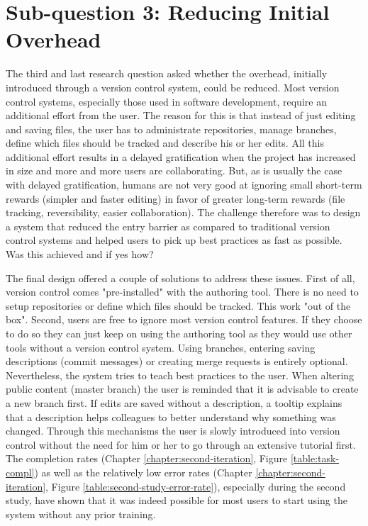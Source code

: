 \section{Sub-question 3: Reducing Initial Overhead}
The third and last research question asked whether the overhead, initially introduced through a version control system, could be reduced. Most version control systems, especially those used in software development, require an additional effort from the user. The reason for this is that instead of just editing and saving files, the user has to administrate repositories, manage branches, define which files should be tracked and describe his or her edits. All this additional effort results in a delayed gratification when the project has increased in size and more and more users are collaborating. But, as is usually the case with delayed gratification, humans are not very good at ignoring small short-term rewards (simpler and faster editing) in favor of greater long-term rewards (file tracking, reversibility, easier collaboration). The challenge therefore was to design a system that reduced the entry barrier as compared to traditional version control systems and helped users to pick up best practices as fast as possible. Was this achieved and if yes how?

The final design offered a couple of solutions to address these issues. First of all, version control comes "pre-installed" with the authoring tool. There is no need to setup repositories or define which files should be tracked. This work "out of the box". Second, users are free to ignore most version control features. If they choose to do so they can just keep on using the authoring tool as they would use other tools without a version control system. Using branches, entering saving descriptions (commit messages) or creating merge requests is entirely optional. Nevertheless, the system tries to teach best practices to the user. When altering public content (master branch) the user is reminded that it is advisable to create a new branch first. If edits are saved without a description, a tooltip explains that a description helps colleagues to better understand why something was changed. Through this mechanisms the user is slowly introduced into version control without the need for him or her to go through an extensive tutorial first. The completion rates (Chapter \ref{chapter:second-iteration}, Figure \ref{table:task-compl}) as well as the relatively low error rates (Chapter \ref{chapter:second-iteration}, Figure \ref{table:second-study-error-rate}), especially during the second study, have shown that it was indeed possible for most users to start using the system without any prior training.


